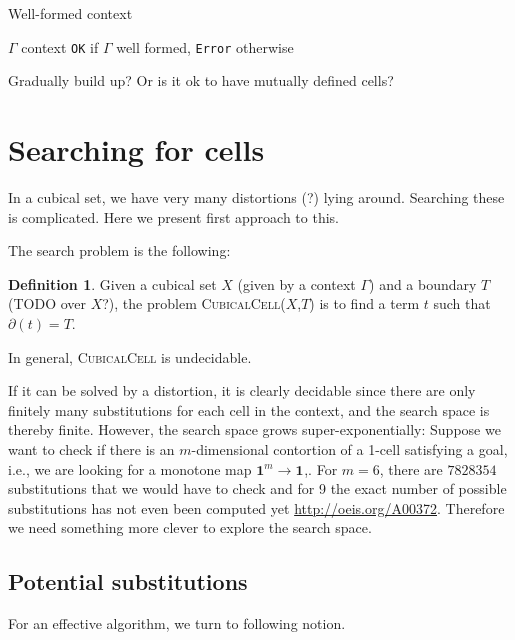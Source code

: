 \documentclass[11pt]{article}
\theoremstyle{definition}
\newtheorem{definition}{Definition}
\newcommand{\problem}[1]{\textsc{{#1}}}
\newcommand{\pint}[1]{\mathbf{1}^{#1}}
\newcommand{\boundary}[1]{\partial({#1})}
\begin{document}
\begin{algorithm}[H]
  \caption{Well-formed context}\label{alg:wellformedcontext}
  \begin{algorithmic}
    \Require $\Gamma$ context
    \Ensure \texttt{OK} if $\Gamma$ well formed, \texttt{Error} otherwise

    \State Gradually build up? Or is it ok to have mutually defined cells?
    \EndProcedure
  \end{algorithmic}
\end{algorithm}



\section{Searching for cells}

In a cubical set, we have very many distortions (?) lying around. Searching
these is complicated. Here we present first approach to this.

The search problem is the following:

\begin{definition}
  Given a cubical set $X$ (given by a context $\Gamma$) and a boundary $T$ (TODO over $X$?), the problem
  \problem{CubicalCell}($X$,$T$) is to find a term $t$ such that $\boundary{t} = T$.
\end{definition}

In general, \problem{CubicalCell} is undecidable.

If it can be solved by a distortion, it is clearly decidable since there are
only finitely many substitutions for each cell in the context, and the search
space is thereby finite. However, the search space grows super-exponentially:
Suppose we want to check if there is an $m$-dimensional contortion of a 1-cell
satisfying a goal, i.e., we are looking for a monotone map $\pint{m} \to
\pint{}$,. For $m = 6$, there are $7828354$ substitutions that we would have to
check and for 9 the exact number of possible substitutions has not even been
computed yet \url{http://oeis.org/A00372}. Therefore we need something more
clever to explore the search space.


\subsection{Potential substitutions}

For an effective algorithm, we turn to following notion.
\end{document}
